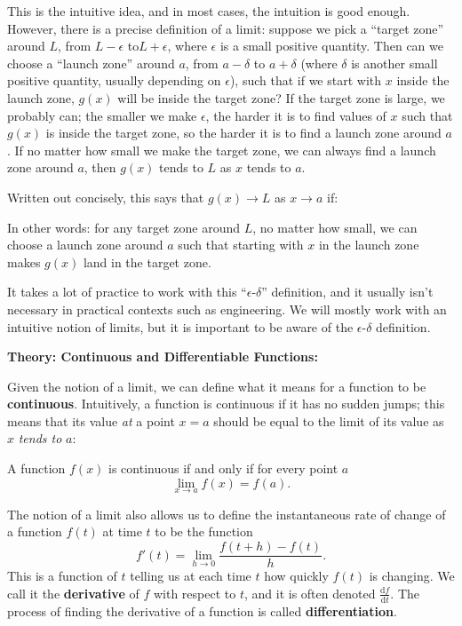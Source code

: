 \documentclass{article}
\newcommand{\deriv}[2]{\frac{\mathrm{d}#1}{\mathrm{d}#2}}
\begin{document}
This is the intuitive idea, and in most cases, the intuition is good enough. However, there is a precise definition of a limit: suppose we pick a ``target zone'' around $L$, from $L-\epsilon$ to$L+\epsilon$, where $\epsilon$ is a small positive quantity. Then can we choose a ``launch zone'' around $a$, from $a-\delta$ to $a+\delta$ (where $\delta$ is another small positive quantity, usually depending on $\epsilon$), such that if we start with $x$ inside the launch zone, $g(x)$ will be inside the target zone? If the target zone is large, we probably can; the smaller we make $\epsilon$, the harder it is to find values of $x$ such that $g(x)$ is inside the target zone, so the harder it is to find a launch zone around $a$. If no matter how small we make the target zone, we can always find a launch zone around $a$, then $g(x)$ tends to $L$ as $x$ tends to $a$.

Written out concisely, this says that $g(x)\to L$ as $x\to a$ if:

\noindent{}\bigskip

In other words: for any target zone around $L$, no matter how small, we can choose a launch zone around $a$ such that starting with $x$ in the launch zone makes $g(x)$ land in the target zone.

It takes a lot of practice to work with this ``$\epsilon$-$\delta$'' definition, and it usually isn't necessary in practical contexts such as engineering. We will mostly work with an intuitive notion of limits, but it is important to be aware of the $\epsilon$-$\delta$ definition.

\clearpage



\textbf{Theory: Continuous and Differentiable Functions:}

\vspace{5mm}


Given the notion of a limit, we can define what it means for a function to be \textbf{continuous}. Intuitively, a function is continuous if it has no sudden jumps; this means that its value \textit{at} a point $x=a$ should be equal to the limit of its value as $x$ \textit{tends to} $a$:

A function $f(x)$ is continuous if and only if for every point $a$
\[\lim_{x\to a}f(x)=f(a).\]

\vfill


The notion of a limit also allows us to define the instantaneous rate of change of a function $f(t)$ at time $t$ to be the function
\[f'(t)=\lim_{h\to 0}\frac{f(t+h)-f(t)}{h}.\]
This is a function of $t$ telling us at each time $t$ how quickly $f(t)$ is changing. We call it the \textbf{derivative} of $f$ with respect to $t$, and it is often denoted $\deriv{f}{t}$. The process of finding the derivative of a function is called \textbf{differentiation}.
\end{document}
